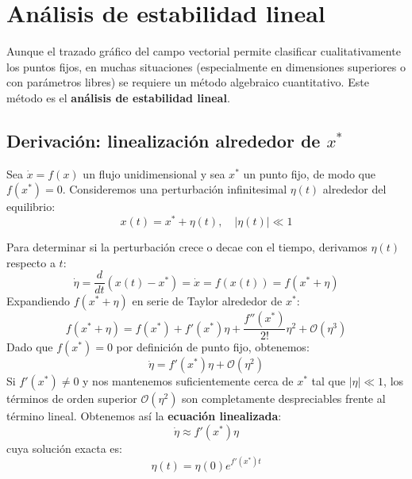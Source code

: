 \section{Análisis de estabilidad lineal}
\label{sec:estabilidad_lineal}

Aunque el trazado gráfico del campo vectorial permite clasificar cualitativamente los puntos fijos, en muchas situaciones (especialmente en dimensiones superiores o con parámetros libres) se requiere un método algebraico cuantitativo. Este método es el \textbf{análisis de estabilidad lineal}.

\subsection{Derivación: linealización alrededor de $x^{*}$}

Sea $\dot{x} = f(x)$ un flujo unidimensional y sea $x^*$ un punto fijo, de modo que $f(x^*) = 0$. Consideremos una perturbación infinitesimal $\eta(t)$ alrededor del equilibrio:
\begin{equation}
    x(t) = x^* + \eta(t), \quad |\eta(t)| \ll 1
    \label{eq:perturbacion_def}
\end{equation}

Para determinar si la perturbación crece o decae con el tiempo, derivamos $\eta(t)$ respecto a $t$:
\begin{equation}
    \dot{\eta} = \frac{d}{dt}(x(t) - x^*) = \dot{x} = f(x(t)) = f(x^* + \eta)
\end{equation}
Expandiendo $f(x^* + \eta)$ en serie de Taylor alrededor de $x^*$:
\begin{equation}
    f(x^* + \eta) = f(x^*) + f'(x^*)\eta + \frac{f''(x^*)}{2!}\eta^2 + \mathcal{O}(\eta^3)
\end{equation}
Dado que $f(x^*) = 0$ por definición de punto fijo, obtenemos:
\begin{equation}
    \dot{\eta} = f'(x^*)\eta + \mathcal{O}(\eta^2)
\end{equation}
Si $f'(x^*) \neq 0$ y nos mantenemos suficientemente cerca de $x^*$ tal que $|\eta| \ll 1$, los términos de orden superior $\mathcal{O}(\eta^2)$ son completamente despreciables frente al término lineal. Obtenemos así la \textbf{ecuación linealizada}:
\begin{equation}
    \dot{\eta} \approx f'(x^*)\eta
    \label{eq:linealizada_eta}
\end{equation}
cuya solución exacta es:
\begin{equation}
    \eta(t) = \eta(0) e^{f'(x^*) t}
    \label{eq:sol_linealizada}
\end{equation}

